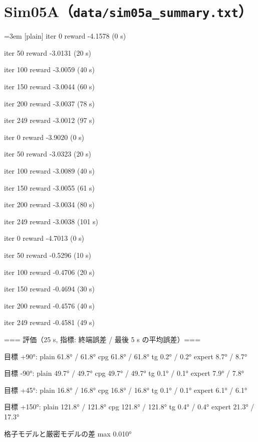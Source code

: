 \section{Sim05A（\texttt{data/sim05a\_summary.txt}）}
{\footnotesize\raggedright\sloppy\setlength{\parindent}{0pt}\setlength{\parskip}{0pt}\emergencystretch=3em
[plain] iter    0  reward -4.1578  (0 s)\par
[plain] iter   50  reward -3.0131  (20 s)\par
[plain] iter  100  reward -3.0059  (40 s)\par
[plain] iter  150  reward -3.0044  (60 s)\par
[plain] iter  200  reward -3.0037  (78 s)\par
[plain] iter  249  reward -3.0012  (97 s)\par
[cpg] iter    0  reward -3.9020  (0 s)\par
[cpg] iter   50  reward -3.0323  (20 s)\par
[cpg] iter  100  reward -3.0089  (40 s)\par
[cpg] iter  150  reward -3.0055  (61 s)\par
[cpg] iter  200  reward -3.0034  (80 s)\par
[cpg] iter  249  reward -3.0038  (101 s)\par
[tg] iter    0  reward -4.7013  (0 s)\par
[tg] iter   50  reward -0.5296  (10 s)\par
[tg] iter  100  reward -0.4706  (20 s)\par
[tg] iter  150  reward -0.4694  (30 s)\par
[tg] iter  200  reward -0.4576  (40 s)\par
[tg] iter  249  reward -0.4581  (49 s)\par
\mbox{}\par
=== 評価（25 s, 指標: 終端誤差 / 最後 5 s の平均誤差）===\par
目標   +90°:  plain  61.8° /  61.8°  cpg  61.8° /  61.8°  tg   0.2° /   0.2°  expert   8.7° /   8.7°\par
目標   -90°:  plain  49.7° /  49.7°  cpg  49.7° /  49.7°  tg   0.1° /   0.1°  expert   7.9° /   7.8°\par
目標   +45°:  plain  16.8° /  16.8°  cpg  16.8° /  16.8°  tg   0.1° /   0.1°  expert   6.1° /   6.1°\par
目標  +150°:  plain 121.8° / 121.8°  cpg 121.8° / 121.8°  tg   0.4° /   0.4°  expert  21.3° /  17.3°\par
[plain] 格子モデルと厳密モデルの差 max 0.010°\par
}
